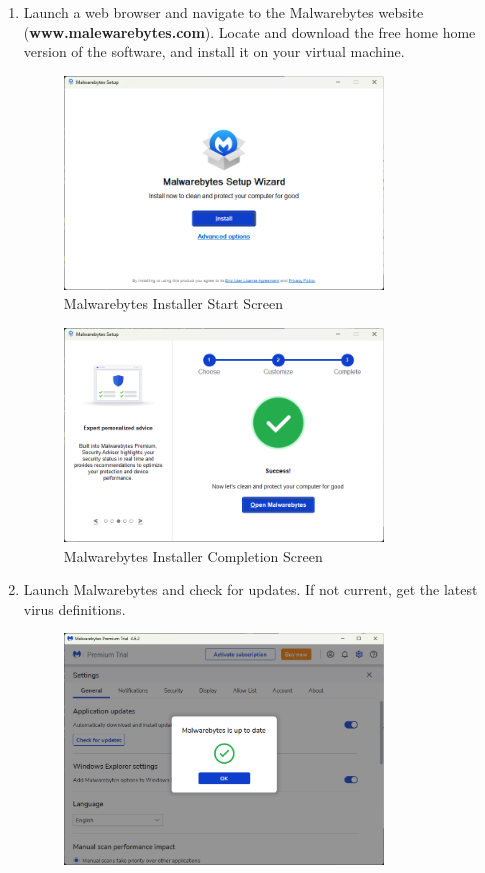 \documentclass[12pt]{article}
\newenvironment{problem}[2][Problem]{\begin{trivlist}
\item[\hskip \labelsep {\bfseries #1}\hskip \labelsep {\bfseries #2.}]}{\end{trivlist}}
\begin{document}
\begin{problem}{1}
\begin{enumerate}
    \item Launch a web browser and navigate to the Malwarebytes website (\textbf{www.malewarebytes.com}). Locate and download the free home home version of the software, and install it on your virtual machine.
    \begin{figure}[H]
        \centering
        \includegraphics[width=0.8\textwidth]{install1}
        \caption{Malwarebytes Installer Start Screen}
    \end{figure}
    \begin{figure}[H]
        \centering
        \includegraphics[width=0.8\textwidth]{install2}
        \caption{Malwarebytes Installer Completion Screen}
    \end{figure}
    \item Launch Malwarebytes and check for updates. If not current, get the latest virus definitions.
    \begin{figure}[H]
        \centering
        \includegraphics[width=0.8\textwidth]{update}

\end{figure}
\end{enumerate}
\end{problem}
\end{document}
